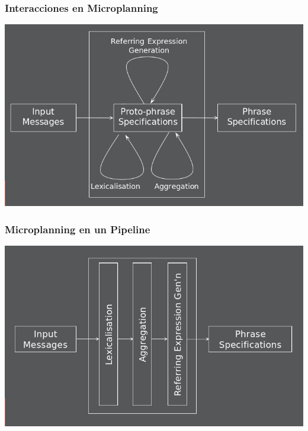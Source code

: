 \documentclass[compress,color=usenames]{beamer}
\begin{document}
\begin{frame}
\frametitle{Interacciones en Microplanning}

\begin{center}
\includegraphics[scale=.4]{pics/pic12.jpg}
\end{center}
 
\end{frame}

\begin{frame}
\frametitle{Microplanning en un Pipeline}

\begin{center}
\includegraphics[scale=.4]{pics/pic13.jpg}
\end{center}
 
\end{frame}
\end{document}
